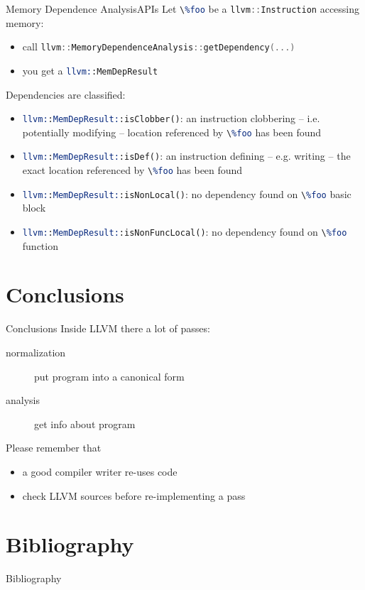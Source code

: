 \documentclass[10pt,mathserif]{beamer}
\newcommand{\cppinline}[1]{\lstinline[language=C++]!#1!}
\newcommand{\llvminline}[1]{\lstinline[language=LLVM]!#1!}
\begin{document}
\begin{frame}{Memory Dependence Analysis}{APIs}
Let \llvminline{\%foo} be a \cppinline{llvm::Instruction} accessing memory:

\begin{itemize}
\item call \cppinline{llvm::MemoryDependenceAnalysis::getDependency(...)}
\item you get a \llvminline{llvm::MemDepResult}
\end{itemize}

\vfill
Dependencies are classified:

\begin{itemize}
\item \llvminline{llvm::MemDepResult::isClobber()}: an instruction clobbering --
      i.e. potentially modifying -- location referenced by \llvminline{\%foo}
      has been found
\item \llvminline{llvm::MemDepResult::isDef()}: an instruction defining -- e.g.
      writing -- the exact location referenced by \llvminline{\%foo} has been
      found
\item \llvminline{llvm::MemDepResult::isNonLocal()}: no dependency found on
      \llvminline{\%foo} basic block
\item \llvminline{llvm::MemDepResult::isNonFuncLocal()}: no dependency found on
      \llvminline{\%foo} function
\end{itemize}
\end{frame}

\section{Conclusions}
\begin{frame}{Conclusions}
Inside LLVM there a lot of passes:

\begin{description}
\item[normalization] put program into a canonical form
\item[analysis] get info about program
\end{description}

\vfill
Please remember that

\begin{itemize}
\item a good compiler writer \alert{re-uses} code
\item check LLVM sources before re-implementing a pass
\end{itemize}
\vfill
\end{frame}

\section{Bibliography}
\begin{frame}[allowframebreaks]{Bibliography}
\nocite{*}


\end{frame}
\end{document}
